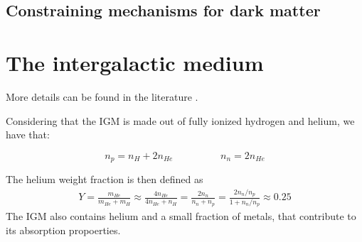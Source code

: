 \subsection{Constraining mechanisms for dark matter}



\section{The intergalactic medium}
More details can be found in the literature \cite{Mo2010}.

Considering that the IGM is made out of fully ionized hydrogen and helium, we have that:

\begin{equation}
    n_p=n_H+2n_{He} \hspace{2cm} n_n=2n_{He}
\end{equation}

The helium weight fraction is then defined as
\begin{eqnarray}
    Y=\frac{m_{He}}{m_{He}+m_H}\approx \frac{4n_{He}}{4n_{He}+n_H}=\frac{2n_n}{n_n+n_p}=\frac{2 n_n/n_p}{1+n_n/n_p}\approx 0.25 
\end{eqnarray}
The IGM also contains helium and a small fraction of metals, that contribute to its absorption propoerties.

